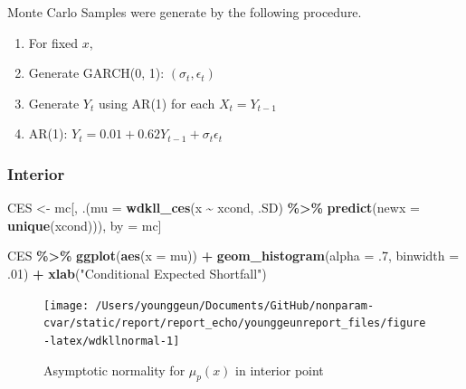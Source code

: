 \documentclass[
]{article}
\newenvironment{Shaded}{\begin{snugshade}}{\end{snugshade}}
\newcommand{\DataTypeTok}[1]{\textcolor[rgb]{0.13,0.29,0.53}{#1}}
\newcommand{\FloatTok}[1]{\textcolor[rgb]{0.00,0.00,0.81}{#1}}
\newcommand{\KeywordTok}[1]{\textcolor[rgb]{0.13,0.29,0.53}{\textbf{#1}}}
\newcommand{\NormalTok}[1]{#1}
\newcommand{\OperatorTok}[1]{\textcolor[rgb]{0.81,0.36,0.00}{\textbf{#1}}}
\newcommand{\StringTok}[1]{\textcolor[rgb]{0.31,0.60,0.02}{#1}}
\providecommand{\tightlist}{%
  \setlength{\itemsep}{0pt}\setlength{\parskip}{0pt}}
\theoremstyle{definition}
\theoremstyle{definition}
\theoremstyle{definition}
\theoremstyle{remark}
\begin{document}
Monte Carlo Samples were generate by the following procedure.

\begin{enumerate}
\def\labelenumi{\arabic{enumi}.}
\tightlist
\item
  For fixed \(x\),
\item
  Generate GARCH(0, 1): \((\sigma_t, \epsilon_t)\)
\item
  Generate \(Y_t\) using AR(1) for each \(X_t = Y_{t - 1}\)
\item
  AR(1): \(Y_t = 0.01 + 0.62 Y_{t - 1} + \sigma_t \epsilon_t\)
\end{enumerate}

\hypertarget{interior}{%
\subsubsection{Interior}\label{interior}}

\begin{Shaded}
\begin{Highlighting}[]
\NormalTok{CES <{-}}\StringTok{ }
\StringTok{  }\NormalTok{mc[,}
\NormalTok{     .(}\DataTypeTok{mu =}
         \KeywordTok{wdkll\_ces}\NormalTok{(x }\OperatorTok{\textasciitilde{}}\StringTok{ }\NormalTok{xcond, .SD) }\OperatorTok{\%>\%}\StringTok{ }
\StringTok{         }\KeywordTok{predict}\NormalTok{(}\DataTypeTok{newx =} \KeywordTok{unique}\NormalTok{(xcond))),}
\NormalTok{     by =}\StringTok{ }\NormalTok{mc]}
\end{Highlighting}
\end{Shaded}

\begin{Shaded}
\begin{Highlighting}[]
\NormalTok{CES }\OperatorTok{\%>\%}\StringTok{ }
\StringTok{  }\KeywordTok{ggplot}\NormalTok{(}\KeywordTok{aes}\NormalTok{(}\DataTypeTok{x =}\NormalTok{ mu)) }\OperatorTok{+}
\StringTok{  }\KeywordTok{geom\_histogram}\NormalTok{(}\DataTypeTok{alpha =} \FloatTok{.7}\NormalTok{, }\DataTypeTok{binwidth =} \FloatTok{.01}\NormalTok{) }\OperatorTok{+}
\StringTok{  }\KeywordTok{xlab}\NormalTok{(}\StringTok{"Conditional Expected Shortfall"}\NormalTok{)}
\end{Highlighting}
\end{Shaded}

\begin{figure}[H]

{\centering \texttt{[image: /Users/younggeun/Documents/GitHub/nonparam-cvar/static/report/report\_echo/younggeunreport\_files/figure-latex/wdkllnormal-1]} 

}

\caption{Asymptotic normality for $\hat\mu_p(x)$ in interior point}\label{fig:wdkllnormal}
\end{figure}
\end{document}
